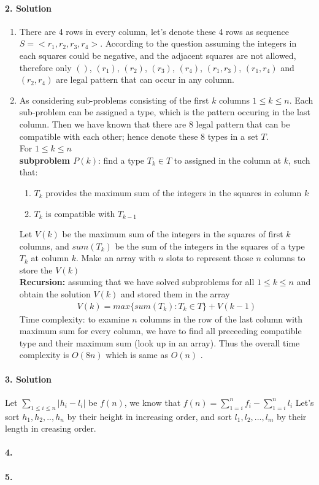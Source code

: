 \documentclass[a4paper]{scrartcl}
\begin{document}
\paragraph{2. Solution}
\label{sec:Question 2}
\begin{enumerate}[label=(\alph*)]
  \item There are 4 rows in every column, let's denote these 4 rows as sequence $S=\big<r_1,r_2,r_3,r_4\big>$.
  According to the question assuming the integers in each squares could be negative, and the adjacent squares are not allowed, therefore only $()$, $(r_1)$, $(r_2)$, $(r_3)$, $(r_4)$, $(r_1, r_3)$, $(r_1, r_4)$ and $(r_2, r_4)$ are legal pattern that can occur in any column. \\
  \item As considering sub-problems consisting of the first $k$ columns $1\leq k \leq n$. Each sub-problem can be assigned a type, which is the pattern occuring in the last column. Then we have known that there are 8 legal pattern that can be compatible with each other; hence denote these 8 types in a set $T$. \\ 
  For $1\leq k \leq n$\\
  \textbf{subproblem $P(k)$}: find a type $T_k \in T$ to assigned in the column at $k$, such that: 
  \begin{enumerate}[label=(\arabic{*})]
    \item $T_k$ provides the maximum sum of the integers in the squares in column $k$
    \item $T_k$ is compatible with $T_{k-1}$
  \end{enumerate}
  Let $V(k)$ be the maximum sum of the integers in the squares of first $k$ columns, and $sum(T_k)$ be the sum of the integers in the squares of a type $T_k$ at column $k$.
  Make an array with $n$ slots to represent those $n$ columns to store the $V(k)$\\
\textbf{Recursion:} assuming that we have solved subproblems for all $1\leq k \leq n$ and obtain the solution $V(k)$ and stored them in the array
\begin{align*}
  V(k)=  max\{ sum(T_k) : T_k \in T \} +V(k-1) 
\end{align*}
Time complexity: to examine $n$ columns in the row of the last column with maximum sum for every column, we have to find all preceeding compatible type and their maximum sum (look up in an array). Thus the overall time complexity is $O(8n)$ which is same as $O(n)$ .
\end{enumerate}
\paragraph{3. Solution}
\label{sec:Question 3}
Let $\sum_{1\leq i \leq n} |h_i - l_i|$ be $f(n)$, we know that $f(n) = \sum_{1=i}^{n} f_i -\sum_{1=i}^{n} l_i $
Let's sort $h_1,h_2,..,h_n$ by their height in increasing order, and sort $l_1,l_2,...,l_m$ by their length in creasing order.\\
\paragraph{4.}
\label{sec:Question 4}

\paragraph{5.}
\label{sec:Question 5}
\end{document}
